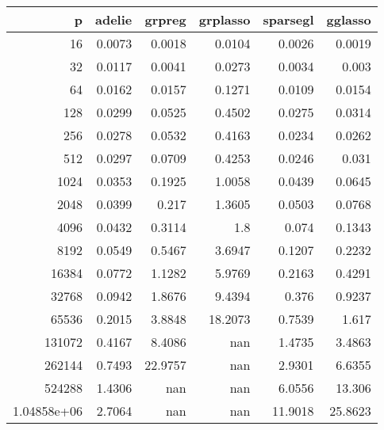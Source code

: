 \begin{tabular}{rrrrrr}
\hline
                p &   adelie &   grpreg &   grplasso &   sparsegl &   gglasso \\
\hline
     16           &      0.0073 &   0.0018 &     0.0104 &     0.0026 &    0.0019 \\
     32           &      0.0117 &   0.0041 &     0.0273 &     0.0034 &    0.003  \\
     64           &      0.0162 &   0.0157 &     0.1271 &     0.0109 &    0.0154 \\
    128           &      0.0299 &   0.0525 &     0.4502 &     0.0275 &    0.0314 \\
    256           &      0.0278 &   0.0532 &     0.4163 &     0.0234 &    0.0262 \\
    512           &      0.0297 &   0.0709 &     0.4253 &     0.0246 &    0.031  \\
   1024           &      0.0353 &   0.1925 &     1.0058 &     0.0439 &    0.0645 \\
   2048           &      0.0399 &   0.217  &     1.3605 &     0.0503 &    0.0768 \\
   4096           &      0.0432 &   0.3114 &     1.8    &     0.074  &    0.1343 \\
   8192           &      0.0549 &   0.5467 &     3.6947 &     0.1207 &    0.2232 \\
  16384           &      0.0772 &   1.1282 &     5.9769 &     0.2163 &    0.4291 \\
  32768           &      0.0942 &   1.8676 &     9.4394 &     0.376  &    0.9237 \\
  65536           &      0.2015 &   3.8848 &    18.2073 &     0.7539 &    1.617  \\
 131072           &      0.4167 &   8.4086 &   nan      &     1.4735 &    3.4863 \\
 262144           &      0.7493 &  22.9757 &   nan      &     2.9301 &    6.6355 \\
 524288           &      1.4306 & nan      &   nan      &     6.0556 &   13.306  \\
      1.04858e+06 &      2.7064 & nan      &   nan      &    11.9018 &   25.8623 \\
\hline
\end{tabular}